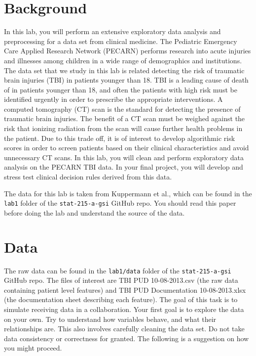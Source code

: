 \documentclass[10pt,letterpaper]{article}
\begin{document}
\section*{Background}

In this lab, you will perform an extensive exploratory data analysis and preprocessing for a data set from clinical medicine. The Pediatric Emergency Care Applied Research Network (PECARN) performs research into acute injuries and illnesses among children in a wide range of demographics and institutions. The data set that we study in this lab is related detecting the risk of traumatic brain injuries (TBI) in patients younger than 18. TBI is a leading cause of death of in patients younger than 18, and often the patients with high risk must be identified urgently in order to prescribe the appropriate interventions. A computed tomography (CT) scan is the standard for detecting the presence of traumatic brain injuries. The benefit of a CT scan must be weighed against the risk that ionizing radiation from the scan will cause further health problems in the patient. Due to this trade off, it is of interest to develop algorithmic risk scores in order to screen patients based on their clinical characteristics and avoid unnecessary CT scans. In this lab, you will clean and perform exploratory data analysis on the PECARN TBI data. In your final project, you will develop and stress test clinical decision rules derived from this data.

The data for this lab is taken from Kuppermann et al., which can be found in the \texttt{lab1} folder of the \texttt{stat-215-a-gsi} GitHub repo. You should read this paper before doing the lab and understand the source of the data.

\section*{Data}

The raw data can be found in the \texttt{lab1/data} folder of the \texttt{stat-215-a-gsi} GitHub repo. The files of interest are TBI PUD 10-08-2013.csv (the raw data containing patient level features) and TBI PUD Documentation 10-08-2013.xlsx (the documentation sheet describing each feature). The goal of this task is to simulate receiving data in a collaboration. Your first goal is to explore the data on your own. Try to understand how variables behave, and what their relationships are. This also involves carefully cleaning the data set. Do not take data consistency or correctness for granted. The following is a suggestion on how you might proceed.
\end{document}
